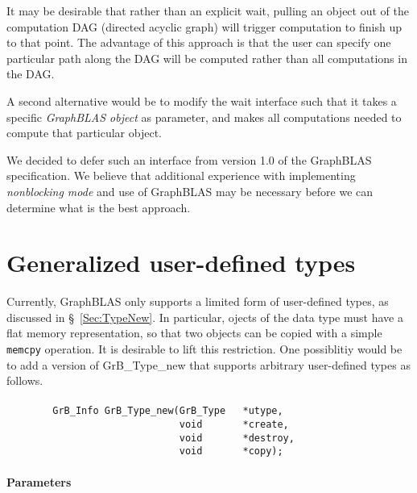 It may be desirable that rather than an explicit {\sf wait}, pulling an object out of the computation DAG (directed acyclic graph) will trigger computation to finish up to that point. The advantage of this approach is that the user can specify one particular path along the DAG will be computed rather than all computations in the DAG.

A second alternative would be to modify the {\sf wait} interface such that it takes a specific \emph{GraphBLAS object} as parameter, and makes all computations needed to compute that particular object.

We decided to defer such an interface from version 1.0 of the GraphBLAS specification. We believe that additional experience with implementing \emph{nonblocking mode} and use of GraphBLAS may be necessary before we can determine what is the best approach.


\section{Generalized user-defined types}

Currently, GraphBLAS only supports a limited form of user-defined types, as discussed in \S~\ref{Sec:TypeNew}. In particular, ojects of the
data type must have a flat memory representation, so that two objects can be copied with a simple {\tt memcpy} operation. 
It is desirable to lift this restriction. One possiblitiy would be to add a version of {\sf GrB\_Type\_new} that supports
arbitrary user-defined types as follows.

\paragraph{\syntax}

\begin{verbatim}
        GrB_Info GrB_Type_new(GrB_Type   *utype,
                              void       *create,
                              void       *destroy,
                              void       *copy);
\end{verbatim}

\paragraph{Parameters}

